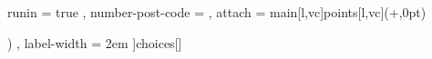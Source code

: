 
  {
    runin = true ,
    number-post-code = \space ,
    attach = { main[l,vc]points[l,vc](\linewidth+\marginparsep,0pt) }
}

\NewTasks[
  counter-format = (tsk[A]) ,
  label-width = 2em
]{choices}[\choice]

\endinput
